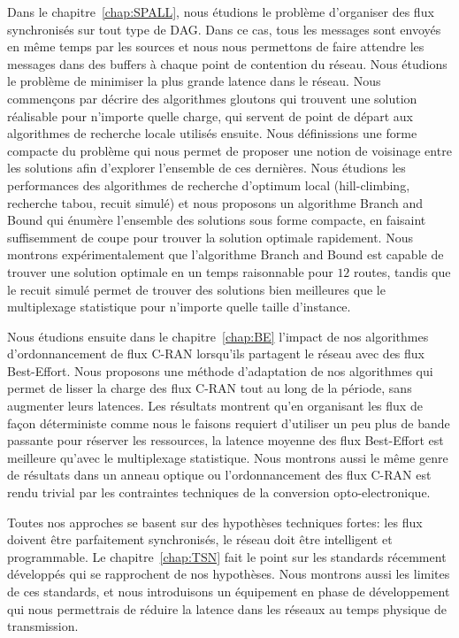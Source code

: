 Dans le chapitre~\ref{chap:SPALL}, nous étudions le problème d'organiser des flux synchronisés sur tout type de DAG. Dans ce cas, tous les messages sont envoyés en même temps par les sources et nous nous permettons de faire attendre les messages dans des buffers à chaque point de contention du réseau. Nous étudions le problème de minimiser la plus grande latence dans le réseau. Nous commençons par décrire des algorithmes gloutons qui trouvent une solution réalisable pour n'importe quelle charge, qui servent de point de départ aux algorithmes de recherche locale utilisés ensuite. Nous définissions une forme compacte du problème qui nous permet de proposer une notion de voisinage entre les solutions afin d'explorer l'ensemble de ces dernières. Nous étudions les performances des algorithmes de recherche d'optimum local (hill-climbing, recherche tabou, recuit simulé) et nous proposons un algorithme Branch and Bound qui énumère l'ensemble des solutions sous forme compacte, en faisaint  suffisemment de coupe pour trouver la solution optimale rapidement. Nous montrons expérimentalement que l'algorithme Branch and Bound est capable de trouver une solution optimale en un temps raisonnable pour $12$ routes, tandis que le recuit simulé permet de trouver des solutions bien meilleures que le multiplexage statistique pour n'importe quelle taille d'instance.

Nous étudions ensuite dans le chapitre~\ref{chap:BE} l'impact de nos algorithmes d'ordonnancement de flux C-RAN lorsqu'ils partagent le réseau avec des flux Best-Effort. Nous proposons une méthode d'adaptation de nos algorithmes qui permet de lisser la charge des flux C-RAN tout au long de la période, sans augmenter leurs latences. Les résultats montrent qu'en organisant les flux de façon déterministe comme nous le faisons requiert d'utiliser un peu plus de bande passante pour réserver les ressources, la latence moyenne des flux Best-Effort est meilleure qu'avec le multiplexage statistique. Nous montrons aussi le même genre de résultats dans un anneau optique ou l'ordonnancement des flux C-RAN est rendu trivial par les contraintes techniques de la conversion opto-electronique.

Toutes nos approches se basent sur des hypothèses techniques fortes: les flux doivent être parfaitement synchronisés, le réseau doit être intelligent et programmable. Le chapitre~\ref{chap:TSN} fait le point sur les standards récemment développés qui se rapprochent de nos hypothèses. Nous montrons aussi les limites de ces standards, et nous introduisons un équipement en phase de développement qui nous permettrais de réduire la latence dans les réseaux au temps physique de transmission.




